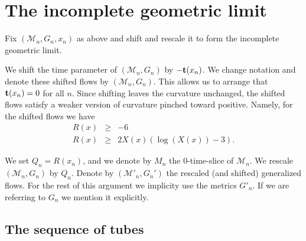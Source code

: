 \section{The incomplete geometric limit}\label{sectincomp}

Fix $({\mathcal M}_n,G_n,x_n)$ as above and shift and rescale it to
form the incomplete geometric limit.

We shift the time parameter of $({\mathcal M}_n,G_n)$ by $-{\bf
t}(x_n)$. We change notation and denote these shifted flows by
$({\mathcal M}_n,G_n)$. This allows us to arrange that ${\bf
t}(x_n)=0$ for all $n$. Since shifting leaves the curvature
unchanged, the shifted flows  satisfy a weaker version of curvature
pinched toward positive. Namely, for the shifted flows we have
\begin{eqnarray}\label{weakerpos}
R(x) & \ge & -6 \nonumber \\
R(x) & \ge & 2X(x)\left(\log(X(x))-3\right).
\end{eqnarray}

 We set $Q_n=R(x_n)$, and we denote by $M_n$ the $0$-time-slice of
${\mathcal M}_n$. We rescale $({\mathcal M}_n,G_n)$ by $Q_n$. Denote
by $({\mathcal M}'_n,G_n')$ the rescaled (and shifted) generalized
flows. For the rest of this argument we implicity use the metrics
$G'_n$. If we are referring to $G_n$ we mention it explicitly.

\subsection{The sequence of tubes}

